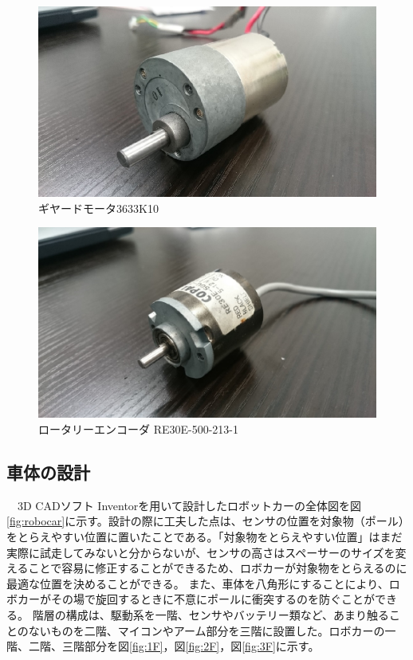 \begin{figure}[H]
 \begin{center}
  \includegraphics[scale=.7]{../kuwano/picture/picture2.eps}
  \caption{ギヤードモータ3633K10}
 \end{center}
\end{figure}

\begin{figure}[H]
 \begin{center}
  \includegraphics[scale=.7]{../kuwano/picture/picture3.eps}
  \caption{ロータリーエンコーダ RE30E-500-213-1}
 \end{center}
\end{figure}



\subsection{車体の設計}
　3D CADソフト Inventorを用いて設計したロボットカーの全体図を図\ref{fig:robocar}に示す。設計の際に工夫した点は、センサの位置を対象物（ポール）をとらえやすい位置に置いたことである。「対象物をとらえやすい位置」はまだ実際に試走してみないと分からないが、センサの高さはスペーサーのサイズを変えることで容易に修正することができるため、ロボカーが対象物をとらえるのに最適な位置を決めることができる。
また、車体を八角形にすることにより、ロボカーがその場で旋回するときに不意にポールに衝突するのを防ぐことができる。
階層の構成は、駆動系を一階、センサやバッテリー類など、あまり触ることのないものを二階、マイコンやアーム部分を三階に設置した。ロボカーの一階、二階、三階部分を図\ref{fig:1F}，図\ref{fig:2F}，図\ref{fig:3F}に示す。

